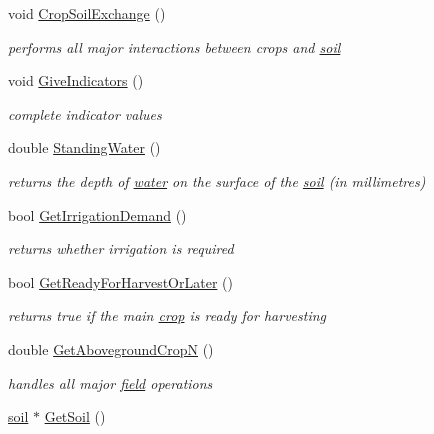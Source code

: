 \begin{DoxyCompactItemize}
void \hyperlink{classecosystem_a7d05455c8cb304e1a4207462f386bdc8}{CropSoilExchange} ()
\begin{DoxyCompactList}\small\item\em performs all major interactions between crops and \hyperlink{classsoil}{soil} \item\end{DoxyCompactList}\item 
void \hyperlink{classecosystem_a2765e63a5da7ecd965342068e69bd10c}{GiveIndicators} ()
\begin{DoxyCompactList}\small\item\em complete indicator values \item\end{DoxyCompactList}\item 
double \hyperlink{classecosystem_a423bd890e368dff9c00300691212d79e}{StandingWater} ()
\begin{DoxyCompactList}\small\item\em returns the depth of \hyperlink{classwater}{water} on the surface of the \hyperlink{classsoil}{soil} (in millimetres) \item\end{DoxyCompactList}\item 
bool \hyperlink{classecosystem_a724c7931285236c1d1f0a55ce17b8295}{GetIrrigationDemand} ()
\begin{DoxyCompactList}\small\item\em returns whether irrigation is required \item\end{DoxyCompactList}\item 
bool \hyperlink{classecosystem_aa4ce724310a879de8e2d242f5cfe4308}{GetReadyForHarvestOrLater} ()
\begin{DoxyCompactList}\small\item\em returns true if the main \hyperlink{classcrop}{crop} is ready for harvesting \item\end{DoxyCompactList}\item 
double \hyperlink{classecosystem_a6b64028f9210f9b93d8edd22daae15d4}{GetAbovegroundCropN} ()
\begin{DoxyCompactList}\small\item\em handles all major \hyperlink{classfield}{field} operations \item\end{DoxyCompactList}\item 
\hyperlink{classsoil}{soil} $\ast$ \hyperlink{classecosystem_a53ac5ef44ba55f24a4210492d909f0d9}{GetSoil} ()

\end{DoxyCompactItemize}
